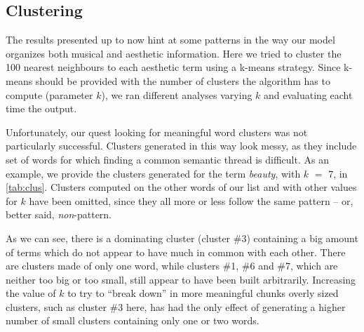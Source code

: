 \subsection{Clustering}
The results presented up to now hint at some patterns in the way our model organizes both musical and aesthetic information. Here we tried to cluster the 100 nearest neighbours to each aesthetic term using a k-means strategy. Since k-means should be provided with the number of clusters the algorithm has to compute (parameter $k$), we ran different analyses varying $k$ and evaluating eacht time the output.

Unfortunately, our quest looking for meaningful word clusters was not particularly successful. Clusters generated in this way look messy, as they include set of words for which finding a common semantic thread is difficult. As an example, we provide the clusters generated for the term \emph{beauty}, with $k$ $=$ 7, in \autoref{tab:clus}. Clusters computed on the other words of our list and with other values for $k$ have been omitted, since they all more or less follow the same pattern -- or, better said, \emph{non}-pattern. 

As we can see, there is a dominating cluster (cluster \#3) containing a big amount of terms which do not appear to have much in common with each other. There are clusters made of only one word, while clusters \#1, \#6 and \#7, which are neither too big or too small, still appear to have been built arbitrarily. Increasing the value of $k$ to try to ``break down'' in more meaningful chunks overly sized clusters, such as cluster \#3 here, has had the only effect of generating a higher number of small clusters containing only one or two words.

